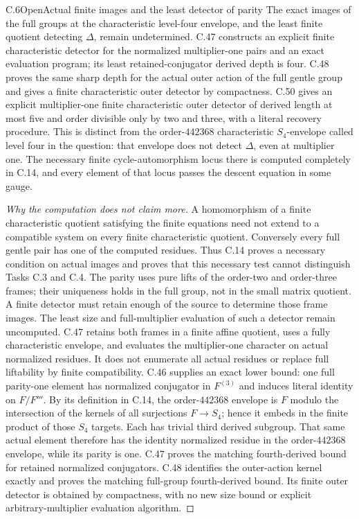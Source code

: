 \begin{statement}{C.6}{Open}{Actual finite images and the least detector of parity}
The exact images of the full groups at the characteristic level-four
envelope, and the least finite quotient detecting $\Delta$, remain
undetermined. C.47 constructs an explicit finite characteristic detector
for the normalized multiplier-one pairs and an exact evaluation program;
its least retained-conjugator derived depth is four. C.48 proves the
same sharp depth for the actual outer action of the full gentle group
and gives a finite characteristic outer detector by compactness. C.50
gives an explicit multiplier-one finite characteristic outer detector
of derived length at most five and order divisible only by two and
three, with a literal recovery procedure. This is distinct
from the order-$442368$ characteristic $S_4$-envelope called level four
in the question: that envelope does not detect $\Delta$, even at
multiplier one. The necessary finite cycle-automorphism locus there is
computed completely in C.14, and every element of that locus passes
the descent equation in some gauge.
\end{statement}
\begin{proof}[Why the computation does not claim more]
A homomorphism of a finite characteristic quotient satisfying the
finite equations need not extend to a compatible system on every
finite characteristic quotient. Conversely every full gentle pair
has one of the computed residues. Thus C.14 proves a necessary
condition on actual images and proves that this necessary test
cannot distinguish Tasks C.3 and C.4. The parity uses pure lifts of
the order-two and order-three frames; their uniqueness holds in the
full group, not in the small matrix quotient. A finite detector must
retain enough of the source to determine those frame images. The
least size and full-multiplier evaluation of such a detector remain
uncomputed. C.47 retains both frames in a finite affine quotient,
uses a fully characteristic envelope, and evaluates the multiplier-one
character on actual normalized residues. It does not enumerate all
actual residues or replace full liftability by finite compatibility.
C.46 supplies an exact lower bound: one full parity-one element has
normalized conjugator in $F^{(3)}$ and induces literal identity on
$F/F'''$. By its definition in C.14, the order-$442368$
envelope is $F$ modulo the intersection of the kernels of all
surjections $F\to S_4$; hence it embeds in the finite product of
those $S_4$ targets. Each has trivial third derived subgroup.
That same actual element therefore
has the identity normalized residue in the order-$442368$ envelope,
while its parity is one. C.47 proves the matching fourth-derived bound
for retained normalized conjugators. C.48 identifies the outer-action
kernel exactly and proves the matching full-group fourth-derived bound.
Its finite outer detector is obtained by compactness, with no new size
bound or explicit arbitrary-multiplier evaluation algorithm.
\end{proof}

